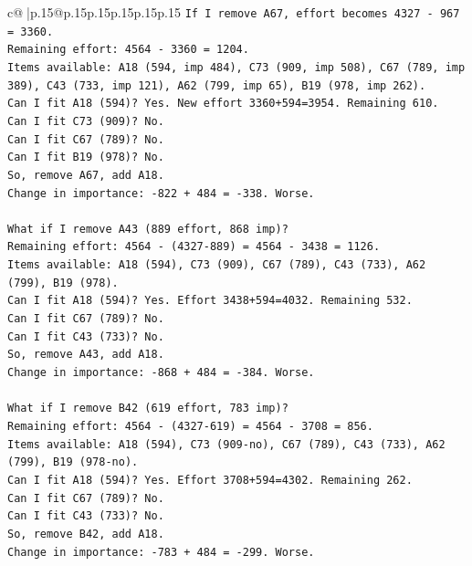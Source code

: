 \documentclass{article}
\begin{document}
{\begin{supertabular}{c@{$\;$}|p{.15\linewidth}@{}p{.15\linewidth}p{.15\linewidth}p{.15\linewidth}p{.15\linewidth}p{.15\linewidth}}
{{{\texttt{If I remove A67, effort becomes 4327 {-} 967 = 3360.} \\
\texttt{Remaining effort: 4564 {-} 3360 = 1204.} \\
\texttt{Items available: A18 (594, imp 484), C73 (909, imp 508), C67 (789, imp 389), C43 (733, imp 121), A62 (799, imp 65), B19 (978, imp 262).} \\
\texttt{Can I fit A18 (594)? Yes. New effort 3360+594=3954. Remaining 610.} \\
\texttt{Can I fit C73 (909)? No.} \\
\texttt{Can I fit C67 (789)? No.} \\
\texttt{Can I fit B19 (978)? No.} \\
\texttt{So, remove A67, add A18.} \\
\texttt{Change in importance: {-}822 + 484 = {-}338. Worse.} \\
\\ 
\texttt{What if I remove A43 (889 effort, 868 imp)?} \\
\texttt{Remaining effort: 4564 {-} (4327{-}889) = 4564 {-} 3438 = 1126.} \\
\texttt{Items available: A18 (594), C73 (909), C67 (789), C43 (733), A62 (799), B19 (978).} \\
\texttt{Can I fit A18 (594)? Yes. Effort 3438+594=4032. Remaining 532.} \\
\texttt{Can I fit C67 (789)? No.} \\
\texttt{Can I fit C43 (733)? No.} \\
\texttt{So, remove A43, add A18.} \\
\texttt{Change in importance: {-}868 + 484 = {-}384. Worse.} \\
\\ 
\texttt{What if I remove B42 (619 effort, 783 imp)?} \\
\texttt{Remaining effort: 4564 {-} (4327{-}619) = 4564 {-} 3708 = 856.} \\
\texttt{Items available: A18 (594), C73 (909{-}no), C67 (789), C43 (733), A62 (799), B19 (978{-}no).} \\
\texttt{Can I fit A18 (594)? Yes. Effort 3708+594=4302. Remaining 262.} \\
\texttt{Can I fit C67 (789)? No.} \\
\texttt{Can I fit C43 (733)? No.} \\
\texttt{So, remove B42, add A18.} \\
\texttt{Change in importance: {-}783 + 484 = {-}299. Worse.} \\
}}}
\end{supertabular}}
\end{document}

